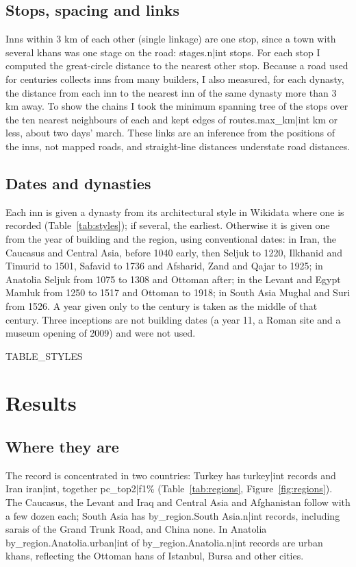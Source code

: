 \documentclass[11pt,a4paper]{article}
\begin{document}
\subsection{Stops, spacing and links}
Inns within 3 km of each other (single linkage) are one stop, since a town with several khans was one stage on the road: {{stages.n|int}} stops. For each stop I computed the great-circle distance to the nearest other stop. Because a road used for centuries collects inns from many builders, I also measured, for each dynasty, the distance from each inn to the nearest inn of the same dynasty more than 3 km away. To show the chains I took the minimum spanning tree of the stops over the ten nearest neighbours of each and kept edges of {{routes.max_km|int}} km or less, about two days' march. These links are an inference from the positions of the inns, not mapped roads, and straight-line distances understate road distances.

\subsection{Dates and dynasties}
Each inn is given a dynasty from its architectural style in Wikidata where one is recorded (Table~\ref{tab:styles}); if several, the earliest. Otherwise it is given one from the year of building and the region, using conventional dates: in Iran, the Caucasus and Central Asia, before 1040 early, then Seljuk to 1220, Ilkhanid and Timurid to 1501, Safavid to 1736 and Afsharid, Zand and Qajar to 1925; in Anatolia Seljuk from 1075 to 1308 and Ottoman after; in the Levant and Egypt Mamluk from 1250 to 1517 and Ottoman to 1918; in South Asia Mughal and Suri from 1526. A year given only to the century is taken as the middle of that century. Three inceptions are not building dates (a year 11, a Roman site and a museum opening of 2009) and were not used.

{{TABLE_STYLES}}

\section{Results}
\subsection{Where they are}
The record is concentrated in two countries: Turkey has {{turkey|int}} records and Iran {{iran|int}}, together {{pc_top2|f1}}\% (Table~\ref{tab:regions}, Figure~\ref{fig:regions}). The Caucasus, the Levant and Iraq and Central Asia and Afghanistan follow with a few dozen each; South Asia has {{by_region.South Asia.n|int}} records, including sarais of the Grand Trunk Road, and China none. In Anatolia {{by_region.Anatolia.urban|int}} of {{by_region.Anatolia.n|int}} records are urban khans, reflecting the Ottoman hans of Istanbul, Bursa and other cities.
\end{document}
